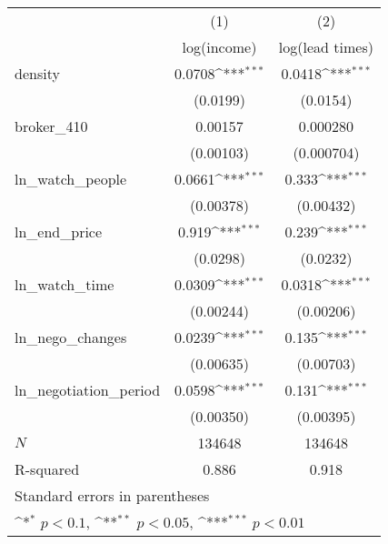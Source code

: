 {
\def\sym#1{\ifmmode^{#1}\else\(^{#1}\)\fi}
\begin{tabular}{l*{2}{c}}
\toprule
            &\multicolumn{1}{c}{(1)}&\multicolumn{1}{c}{(2)}\\
            &\multicolumn{1}{c}{log(income)}&\multicolumn{1}{c}{log(lead times)}\\
\midrule
density     &      0.0708\sym{***}&      0.0418\sym{***}\\
            &    (0.0199)         &    (0.0154)         \\
\addlinespace
broker\_410  &     0.00157         &    0.000280         \\
            &   (0.00103)         &  (0.000704)         \\
\addlinespace
ln\_watch\_people&      0.0661\sym{***}&       0.333\sym{***}\\
            &   (0.00378)         &   (0.00432)         \\
\addlinespace
ln\_end\_price&       0.919\sym{***}&       0.239\sym{***}\\
            &    (0.0298)         &    (0.0232)         \\
\addlinespace
ln\_watch\_time&      0.0309\sym{***}&      0.0318\sym{***}\\
            &   (0.00244)         &   (0.00206)         \\
\addlinespace
ln\_nego\_changes&      0.0239\sym{***}&       0.135\sym{***}\\
            &   (0.00635)         &   (0.00703)         \\
\addlinespace
ln\_negotiation\_period&      0.0598\sym{***}&       0.131\sym{***}\\
            &   (0.00350)         &   (0.00395)         \\
\midrule
\(N\)       &      134648         &      134648         \\
R-squared   &       0.886         &       0.918         \\
\bottomrule
\multicolumn{3}{l}{\footnotesize Standard errors in parentheses}\\
\multicolumn{3}{l}{\footnotesize \sym{*} \(p<0.1\), \sym{**} \(p<0.05\), \sym{***} \(p<0.01\)}\\
\end{tabular}
}
